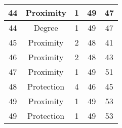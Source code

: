 \documentclass[results.tex]{subfiles}
\begin{document}
\begin{center}
\begin{tabular}{| c || c | c | c | c |}
    \hline
    44 & Proximity & 1 & 49 & 47 \\ 
    \hline
    44 & Degree & 1 & 49 & 47 \\ 
    \hline
    45 & Proximity & 2 & 48 & 41 \\ 
    \hline
    46 & Proximity & 2 & 48 & 43 \\ 
    \hline
    47 & Proximity & 1 & 49 & 51 \\ 
    \hline
    48 & Protection & 4 & 46 & 45 \\ 
    \hline
    49 & Proximity & 1 & 49 & 53 \\ 
    \hline
    49 & Protection & 1 & 49 & 53 \\ 
    \hline   \end{tabular}
\end{center}
\end{document}
